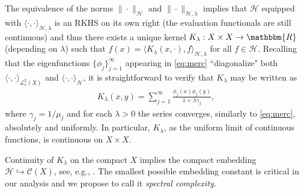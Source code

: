\documentclass[11pt]{article}
\theoremstyle{definition}
\theoremstyle{remark}
\begin{document}
The equivalence of the norms $\|\cdot\|_{\mathcal{H}}$ and $\|\cdot\|_{\mathcal{H},\lambda}$ implies that $\mathcal{H}$ equipped with $\langle \cdot, \cdot \rangle_{\mathcal{H},\lambda}$ is an RKHS on its own right (the evaluation functionals are still continuous) and thus there exists a unique kernel $K_{\lambda}: X \times X \to \mathbbm{R}$ (depending on $\lambda$) such that $f(x) = \langle K_{\lambda}(x,\cdot), f \rangle_{\mathcal{H},\lambda}$ for all $f \in \mathcal{H}$. Recalling that the eigenfunctions $\{\phi_j\}_{j=1}^{\infty}$ appearing in \eqref{eq:merc} ``diagonalize" both $\langle \cdot, \cdot \rangle_{\mathcal{L}^2_v(X)}$ and $\langle \cdot, \cdot \rangle_{\mathcal{H}}$, it is straightforward to verify that $K_{\lambda}$ may be written as
\begin{align}
\label{eq:RK}
K_{\lambda}(x,y) = \sum_{j=1}^{\infty} \frac{\phi_j(x) \phi_j(y)}{1+\lambda \gamma_j},
\end{align}
where $\gamma_j = 1/\mu_j$ and for each $\lambda>0$ the series converges, similarly to \eqref{eq:merc}, absolutely and uniformly. In particular, $K_{\lambda}$, as the uniform limit of continuous functions, is continuous on $X \times X$.

Continuity of $K_{\lambda}$ on the compact $X$ implies the compact embedding $\mathcal{H} \hookrightarrow \mathcal{C}(X)$, see, e.g., \citep[Proposition 4.30]{St:2008}. The smallest possible embedding constant is critical in our analysis and we propose to call it \textit{spectral complexity}.
\end{document}
